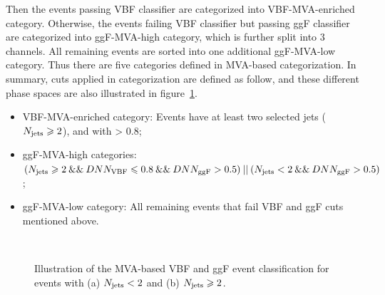 Then the events passing VBF classifier are categorized into VBF-MVA-enriched category.
Otherwise, the events failing VBF classifier but passing ggF classifier are categorized into ggF-MVA-high category, which is further split into 3 channels.
All remaining events are sorted into one additional ggF-MVA-low category.
Thus there are five categories defined in MVA-based categorization.
In summary, cuts applied in categorization are defined as follow, and these different phase spaces are also illustrated in figure~\ref{fig:hmhzz_dnncate}.

\begin{itemize}
	\item VBF-MVA-enriched category: Events have at least two selected jets ($N_{\mathrm{jets}}  \geqslant 2$), and with \DNNVBF > 0.8;
	\item ggF-MVA-high categories: $(N_{\mathrm{jets}}  \geqslant 2 \:\&\&\: DNN_{\mathrm{VBF}} \leqslant 0.8 \:\&\&\: DNN_{\mathrm{ggF}} > 0.5) \:||\: (N_{\mathrm{jets}}  < 2 \:\&\&\: DNN_{\mathrm{ggF}} > 0.5)$; 
	\item ggF-MVA-low category: All remaining events that fail VBF and ggF cuts mentioned above.
\end{itemize}

\begin{figure}[h]
\centering
{}
\\
\caption{Illustration of the MVA-based VBF and ggF event classification for events with (a) $N_{\mathrm{jets}}  < 2$ and (b) $N_{\mathrm{jets}}  \geqslant 2$.}
\label{fig:hmhzz_dnncate}
\end{figure}

